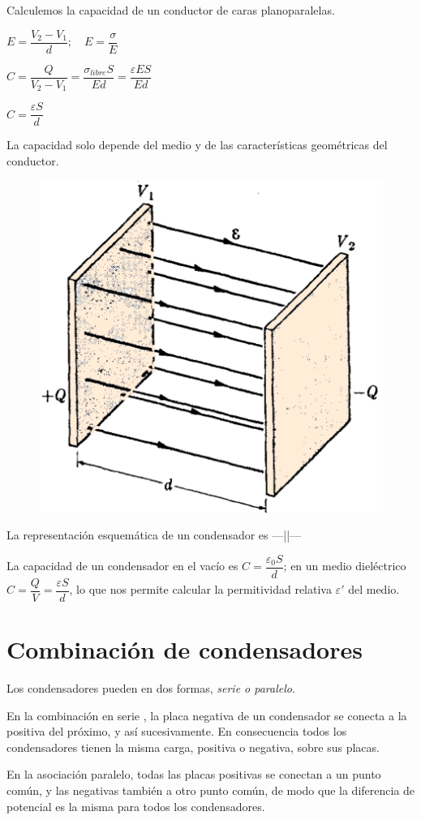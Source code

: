 \begin{multicols}{2}
	Calculemos la capacidad de un conductor de caras planoparalelas.

$E=\dfrac{V_2-V_1}{d}; \quad E=\dfrac \sigma E$

$C=\dfrac {Q}{V_2-V_1}=\dfrac{\sigma_{libre}S}{Ed}=\dfrac{\varepsilon E S}{E d}$

$C=\dfrac{\varepsilon S}{d}$

La capacidad solo depende del medio y de las características geométricas del conductor.
\begin{figure}[H]
	\centering
	\includegraphics[width=.45\textwidth]{imagenes/imagenes24/T24IM12.png}
\end{figure}
\end{multicols}

La representación esquemática de un condensador es ---||---

La capacidad de un condensador en el vacío es $C=\dfrac {\varepsilon_0 S}{d}$; en un medio dieléctrico $C=\dfrac Q V=\dfrac{\varepsilon S}{d}$, lo que nos permite calcular la permitividad relativa $\varepsilon'$ del medio.

\section{Combinación de condensadores}

Los condensadores pueden en dos formas, \emph{serie o paralelo}.

En la combinación en serie , la placa negativa de un condensador se conecta a la positiva del próximo, y así sucesivamente. En consecuencia todos los condensadores tienen la misma carga, positiva o negativa, sobre sus placas.

En la asociación paralelo, todas las placas positivas se conectan a un punto común, y las negativas también a otro punto común, de modo que la diferencia de potencial es la misma para todos los condensadores.

